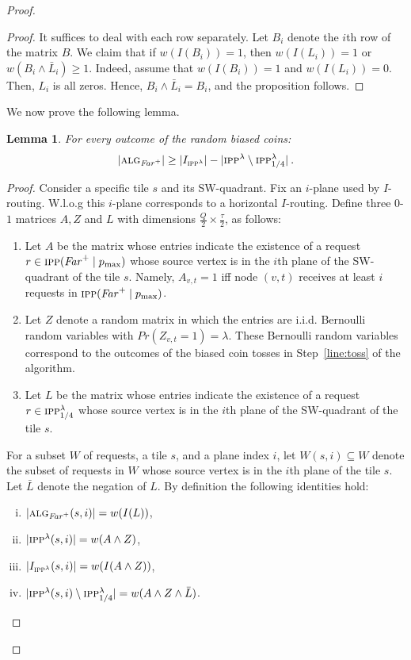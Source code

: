 \documentclass[11pt]{article}
\newtheorem{lemma}[theorem]{Lemma}
\newcommand{\route}{\text{\sc{ipp}}}
\newcommand{\IPP}{\route}
\newcommand{\pmax}{p_{\max}}
\newcommand{\alg}{\text{\sc{alg}}}
\newenvironment{proof sketch}[1]{\noindent {\emph{Proof sketch of #1:}}}{\hfill \qed}
\newcommand{\far}{\text{\emph{Far}}}
\newcommand{\algf}{\alg_{\far^+}}
\newcommand{\RIPP}{\IPP(\far^+ \mid \pmax)}\newcommand{\RIPPt}{\IPP^{\lambda}}
\newcommand{\Rinj}{\RIPPt_{1/4}}
\newcommand{\algfar}{\algf}
\newcommand{\hl}{\tau}
\newcommand{\vl}{Q}
\begin{document}
\begin{proof}
\begin{proof}
  It suffices to deal with each row separately. Let $B_i$ denote the $i$th row
  of the matrix $B$. We claim that if $w(I(B_i))=1$, then $w(I(L_i))=1$ or
  $w(B_i\wedge \bar{L}_i)\geq 1$.  Indeed, assume that $w(I(B_i))=1$ and
  $w(I(L_i))=0$. Then, $L_i$ is all zeros. Hence, $B_i \wedge \bar{L}_i = B_i$, and
  the proposition follows.
\end{proof}

\noindent
We now prove the following lemma.
\begin{lemma}\label{lemma:combine}
    For every outcome of the random biased coins:
  $$|\algfar| \geq |I_{\IPP^{\lambda}}| - |\RIPPt \setminus \Rinj|\:.$$
\end{lemma}
\begin{proof}
  Consider a specific tile $s$ and its SW-quadrant.  Fix an $i$-plane used by
  $I$-routing. W.l.o.g this $i$-plane corresponds to a horizontal $I$-routing. Define
  three $0$-$1$ matrices $A,Z$ and $L$ with dimensions $\frac{\vl}{2}\times \frac{\hl}{2}$, as
  follows:
  \begin{enumerate}
  \item Let $A$ be the matrix whose entries indicate the existence of a request $r\in
    \RIPP$ whose source vertex is in the $i$th plane of the SW-quadrant of the tile
    $s$. Namely, $A_{v,t}=1$ iff node $(v,t)$ receives at least $i$ requests in
    $\RIPP$.
  \item Let $Z$ denote a random matrix in which the entries are i.i.d. Bernoulli
    random variables with $Pr(Z_{v,t}=1)=\lambda$. These Bernoulli random variables
    correspond to the outcomes of the biased coin tosses in Step~\ref{line:toss} of
    the algorithm.
  \item Let $L$ be the matrix whose entries indicate the existence of a request $r\in
    \Rinj$ whose source vertex is in the $i$th plane of the SW-quadrant of the
    tile $s$.
  \end{enumerate}


  For a subset $W$ of requests, a tile $s$, and a plane index $i$, let
  $W(s,i)\subseteq W$ denote the subset of requests in $W$ whose source vertex is in
  the $i$th plane of the tile $s$.  Let $\bar L$ denote the negation of $L$.  By
  definition the following identities hold:
  \begin{enumerate}[(i)]
    \item $|\algfar(s,i)| = w(I(L))$,
    \item $|\RIPPt(s,i)|= w(A\wedge Z)$,
    \item $|I_{\IPP^{\lambda}}(s,i)| = w(I(A \wedge Z))$,
    \item $|\RIPPt(s,i) \setminus \Rinj| = w(A \wedge Z \wedge \bar{L})$.
  \end{enumerate}


\end{proof}
\end{proof}
\end{document}
